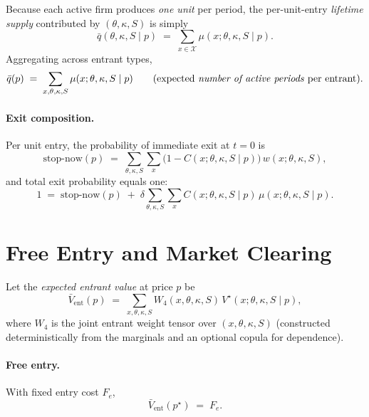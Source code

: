 \documentclass[11pt]{article}
\begin{document}
Because each active firm produces \emph{one unit} per period, the per-unit-entry \emph{lifetime supply} contributed by $(\theta,\kappa,S)$ is simply
\begin{equation}
\bar q(\theta,\kappa,S\mid p)
\;=\;
\sum_{x\in\mathcal{X}} \mu(x;\theta,\kappa,S\mid p).
\end{equation}
Aggregating across entrant types,
\begin{equation}
\bar q(p)
\;=\;
\sum_{x,\theta,\kappa,S} \mu(x;\theta,\kappa,S\mid p)
\qquad\text{(expected \emph{number of active periods} per entrant).}
\label{eq:qbar}
\end{equation}

\paragraph{Exit composition.}
Per unit entry, the probability of immediate exit at $t=0$ is
\[
\text{stop-now}(p) \;=\; \sum_{\theta,\kappa,S}\sum_{x}\big(1-C(x;\theta,\kappa,S\mid p)\big)\,w(x;\theta,\kappa,S),
\]
and total exit probability equals one:
\[
1 \;=\; \text{stop-now}(p) \;+\; \delta \sum_{\theta,\kappa,S}\sum_{x} C(x;\theta,\kappa,S\mid p)\,\mu(x;\theta,\kappa,S\mid p).
\]

\section{Free Entry and Market Clearing}

Let the \emph{expected entrant value} at price $p$ be
\begin{equation}
\bar V_{\text{ent}}(p)
\;=\;
\sum_{x,\theta,\kappa,S} W_4(x,\theta,\kappa,S)\,V^\star(x;\theta,\kappa,S\mid p),
\end{equation}
where $W_4$ is the joint entrant weight tensor over $(x,\theta,\kappa,S)$ (constructed deterministically from the marginals and an optional copula for dependence).

\paragraph{Free entry.} With fixed entry cost $F_e$,
\begin{equation}
\bar V_{\text{ent}}(p^\star) \;=\; F_e.
\label{eq:FE}
\end{equation}
\end{document}
